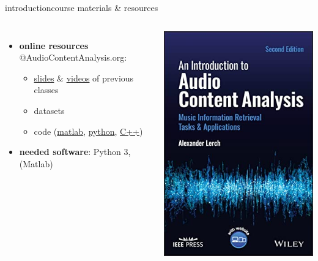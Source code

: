 \begin{frame}{introduction}{course materials \& resources}
\begin{columns}[T]
\begin{itemize}
                        \smallskip
                        \item<3->   \textbf{online resources} @AudioContentAnalysis.org: 
                            \begin{itemize}
                                \item   \href{https://github.com/alexanderlerch/ACA-Slides}{slides} \& \href{https://www.AudioContentAnalysis.org/class}{videos} of previous classes
                                \item   datasets
                                \item   code (\href{https://github.com/alexanderlerch/ACA-Code}{matlab}, \href{https://github.com/alexanderlerch/pyACA}{python}, \href{https://github.com/alexanderlerch/libACA}{C++})
                            \end{itemize}
                        \smallskip
                        \item<4->   \textbf{needed software}: Python 3, (Matlab)
                    \end{itemize}
                     \href{https://ieeexplore.ieee.org/servlet/opac?bknumber=6266785}{\includegraphics[scale=.25]{graph/cover_aca_v2}}
                    \vspace{40mm}
             \end{columns}
       \end{frame}

